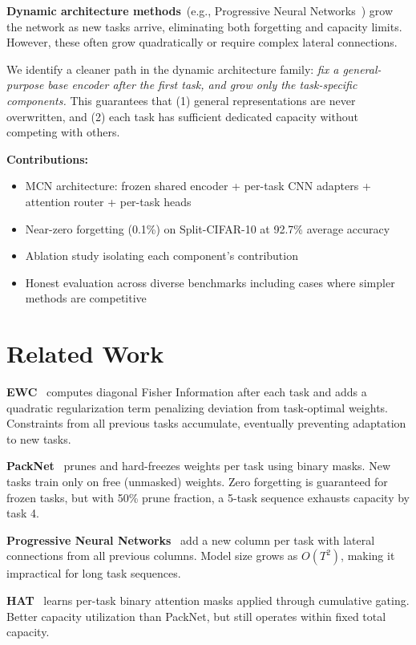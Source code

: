 \documentclass[10pt,twocolumn]{article}
\begin{document}
\textbf{Dynamic architecture methods}~(e.g., Progressive Neural Networks~\cite{pnn2016}) grow the network as new tasks arrive, eliminating both forgetting and capacity limits. However, these often grow quadratically or require complex lateral connections.

We identify a cleaner path in the dynamic architecture family: \emph{fix a general-purpose base encoder after the first task, and grow only the task-specific components.} This guarantees that (1) general representations are never overwritten, and (2) each task has sufficient dedicated capacity without competing with others.

\textbf{Contributions:}
\begin{itemize}
    \item MCN architecture: frozen shared encoder + per-task CNN adapters + attention router + per-task heads
    \item Near-zero forgetting (0.1\%) on Split-CIFAR-10 at 92.7\% average accuracy
    \item Ablation study isolating each component's contribution
    \item Honest evaluation across diverse benchmarks including cases where simpler methods are competitive
\end{itemize}

\section{Related Work}

\textbf{EWC}~\cite{ewc2017} computes diagonal Fisher Information after each task and adds a quadratic regularization term penalizing deviation from task-optimal weights. Constraints from all previous tasks accumulate, eventually preventing adaptation to new tasks.

\textbf{PackNet}~\cite{packnet2018} prunes and hard-freezes weights per task using binary masks. New tasks train only on free (unmasked) weights. Zero forgetting is guaranteed for frozen tasks, but with 50\% prune fraction, a 5-task sequence exhausts capacity by task 4.

\textbf{Progressive Neural Networks}~\cite{pnn2016} add a new column per task with lateral connections from all previous columns. Model size grows as $O(T^2)$, making it impractical for long task sequences.

\textbf{HAT}~\cite{hat2018} learns per-task binary attention masks applied through cumulative gating. Better capacity utilization than PackNet, but still operates within fixed total capacity.
\end{document}
